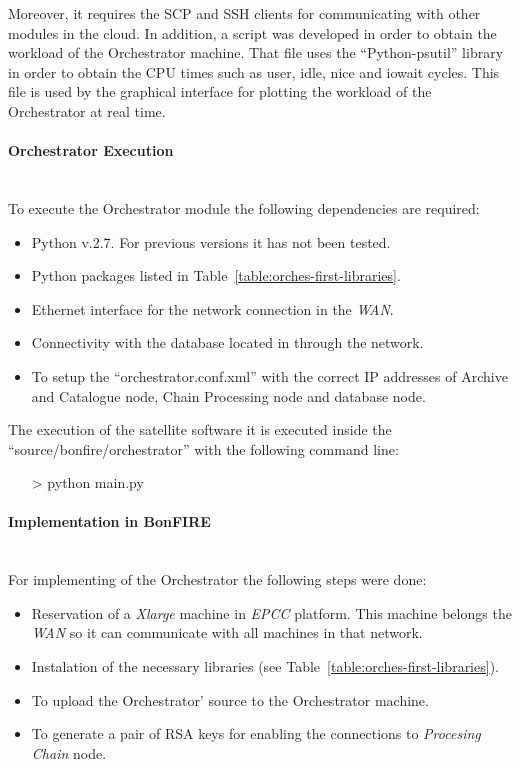 Moreover, it requires the \ac{SCP} and \ac{SSH} clients for communicating  with other
modules in the cloud.
In addition, a script was developed in order to obtain the workload of the
Orchestrator machine. That file uses the ``Python-psutil'' library in order to
obtain the CPU times such as user, idle, nice and iowait cycles. This file is
used by the graphical interface for plotting the workload of the Orchestrator at
real time.


\paragraph{Orchestrator Execution}~\\

To execute the Orchestrator module the following dependencies are required:
\begin{itemize}
\item Python v.2.7. For previous versions it has not been tested.
\item Python packages listed in Table~\ref{table:orches-first-libraries}.
\item Ethernet interface for the network connection in the \bonfire \emph{WAN}.
\item Connectivity with the database located in \bonfire through the network.
\item To setup the ``orchestrator.conf.xml'' with the correct \ac{IP} addresses
  of Archive and Catalogue node, Chain Processing node and database node.
\end{itemize}

The execution of the satellite software it is executed inside the
``source/bonfire/orchestrator'' with the following
command line:
\begin{itemize}
\item[>] python main.py
\end{itemize}
 
\paragraph{Implementation in BonFIRE}~\\

For implementing of the Orchestrator the following steps were done:

\begin{itemize}
 \item Reservation of a \emph{Xlarge} machine in \emph{EPCC} \bonfire
   platform. This machine belongs the \bonfire \emph{WAN} so it can communicate
   with all machines in that network. 
 \item Instalation of the necessary libraries (see
   Table~\ref{table:orches-first-libraries}).
 \item To upload the Orchestrator' source to the Orchestrator machine.
 \item To generate a pair of \ac{RSA} keys for enabling the connections to
   \emph{Procesing Chain} node.
\end{itemize}

